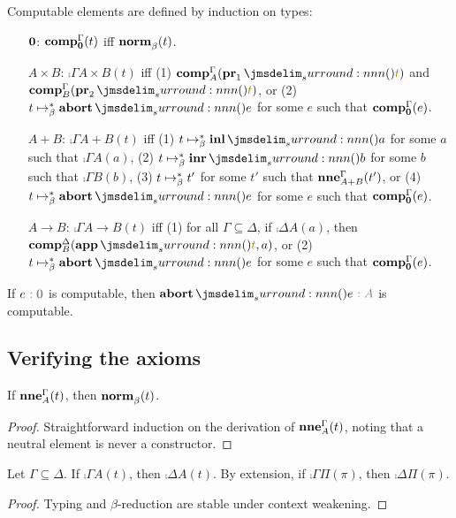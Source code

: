 \documentclass[a4paper]{article}
\begin{document}
\begin{construction}
  Computable elements are defined by induction on types:
  \begin{itemize}
  \item[$\mathbf{0}$:] $\operatorname{\mathbf{comp}}^{\Gamma}_{\mathbf{0}}(t)$ iff $\operatorname{\mathbf{norm}}^{}_{\beta}(t)$.
  \item[$A \times B$:] $\comp{\Gamma}{A \times B}(t)$ iff (1) $\comp{\Gamma}{A}(\tmPrl{t})$ and $\comp{\Gamma}{B}(\tmPrr{t})$, or (2) $t \bRed* \tmAbort{e}$ for some $e$ such that $\operatorname{\mathbf{comp}}^{\Gamma}_{\mathbf{0}}(e)$.
  \item[$A + B$:] $\comp{\Gamma}{A + B}(t)$ iff (1) $t \bRed* \tmInl{a}$ for some $a$ such that $\comp{\Gamma}{A}(a)$, (2) $t \bRed* \tmInr{b}$ for some $b$ such that $\comp{\Gamma}{B}(b)$, (3) $t \bRed* t'$ for some $t'$ such that $\operatorname{\mathbf{nne}}^{\Gamma}_{A + B}(t')$, or (4) $t \bRed* \tmAbort{e}$ for some $e$ such that $\operatorname{\mathbf{comp}}^{\Gamma}_{\mathbf{0}}(e)$.
  \item[$A \to B$:] $\comp{\Gamma}{A \to B}(t)$ iff (1) for all $\Gamma \subseteq \Delta$, if $\comp{\Delta}{A}(a)$, then $\comp{\Delta}{B}(\tmApp{t}{a})$, or (2) $t \bRed* \tmAbort{e}$ for some $e$ such that $\operatorname{\mathbf{comp}}^{\Gamma}_{\mathbf{0}}(e)$.
  \end{itemize}
\end{construction}

\begin{observation}\label{thm:0005}
  If $e\tpAnno{\tpEmp}$ is computable, then $\tmAbort{e}\tpAnno{A}$ is computable.
\end{observation}

\subsection{Verifying the axioms}
\label{sec:0009}

\begin{lemma}\label{thm:0002}
  If $\operatorname{\mathbf{nne}}^{\Gamma}_{A}(t)$, then $\operatorname{\mathbf{norm}}^{}_{\beta}(t)$.
\end{lemma}
\begin{proof}
  Straightforward induction on the derivation of $\operatorname{\mathbf{nne}}^{\Gamma}_{A}(t)$, noting that a neutral element is never a constructor.
\end{proof}

\begin{lemma}\label{thm:1001}
  Let $\Gamma \subseteq \Delta$.
  If $\comp{\Gamma}{A}(t)$, then $\comp{\Delta}{A}(t)$.
  By extension, if $\comp{\Gamma}{\Pi}(\pi)$, then $\comp{\Delta}{\Pi}(\pi)$.
\end{lemma}
\begin{proof}
  Typing and $\beta$-reduction are stable under context weakening.
\end{proof}
\end{document}

